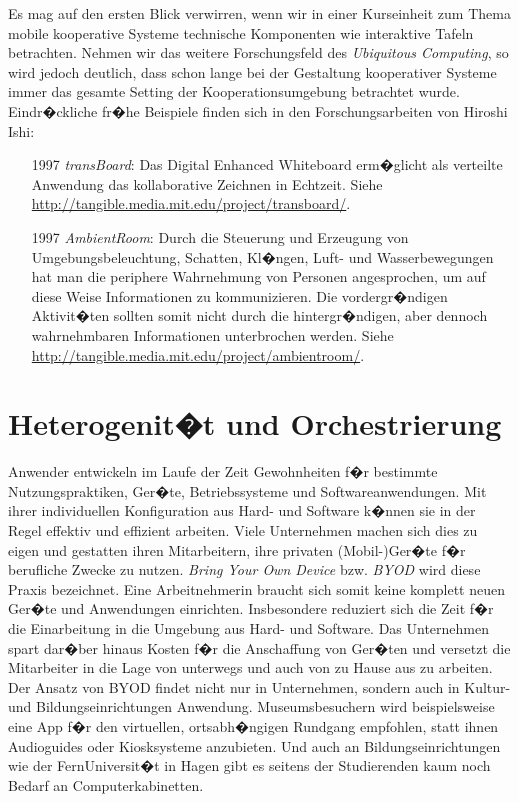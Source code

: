 \begin{example}
Es mag auf den ersten Blick verwirren, wenn wir in einer Kurseinheit zum Thema mobile kooperative Systeme technische Komponenten wie interaktive Tafeln betrachten. Nehmen wir das weitere Forschungsfeld des \emph{Ubiquitous Computing}, so wird jedoch deutlich, dass schon lange bei der Gestaltung kooperativer Systeme immer das gesamte Setting der Kooperationsumgebung betrachtet wurde. Eindr�ckliche fr�he Beispiele finden sich in den Forschungsarbeiten von Hiroshi Ishi:

\begin{itemize}
\item[1997] \textit{transBoard}: Das Digital Enhanced Whiteboard erm�glicht als verteilte Anwendung das kollaborative Zeichnen in Echtzeit. Siehe \url{http://tangible.media.mit.edu/project/transboard/}.

\item[1997] \textit{AmbientRoom}: Durch die Steuerung und Erzeugung von Umgebungsbeleuchtung, Schatten, Kl�ngen, Luft- und Wasserbewegungen hat man die periphere Wahrnehmung von Personen angesprochen, um auf diese Weise Informationen zu kommunizieren. Die vordergr�ndigen Aktivit�ten sollten somit nicht durch die hintergr�ndigen, aber dennoch wahrnehmbaren Informationen unterbrochen werden. Siehe \url{http://tangible.media.mit.edu/project/ambientroom/}.

\end{itemize}
\end{example}






\section{Heterogenit�t und Orchestrierung}

Anwender entwickeln im Laufe der Zeit Gewohnheiten f�r bestimmte Nutzungspraktiken, Ger�te,  Betriebssysteme und Softwareanwendungen. Mit ihrer individuellen Konfiguration aus Hard- und Software k�nnen sie in der Regel effektiv und effizient arbeiten. Viele Unternehmen machen sich dies zu eigen und gestatten ihren Mitarbeitern, ihre privaten (Mobil-)Ger�te f�r berufliche Zwecke zu nutzen. \textit{Bring Your Own Device} bzw. \textit{BYOD} wird diese Praxis bezeichnet. Eine Arbeitnehmerin braucht sich somit keine komplett neuen Ger�te und Anwendungen einrichten. Insbesondere reduziert sich die Zeit f�r die Einarbeitung in die Umgebung aus Hard- und Software. Das Unternehmen spart dar�ber hinaus Kosten f�r die Anschaffung von Ger�ten und versetzt die Mitarbeiter in die Lage von unterwegs und auch von zu Hause aus zu arbeiten. 
Der Ansatz von BYOD findet nicht nur in Unternehmen, sondern auch in Kultur- und Bildungseinrichtungen Anwendung. Museumsbesuchern wird beispielsweise eine App f�r den virtuellen, ortsabh�ngigen Rundgang empfohlen, statt ihnen Audioguides oder Kiosksysteme anzubieten. Und auch an Bildungseinrichtungen wie der FernUniversit�t in Hagen gibt es seitens der Studierenden kaum noch Bedarf an Computerkabinetten.

